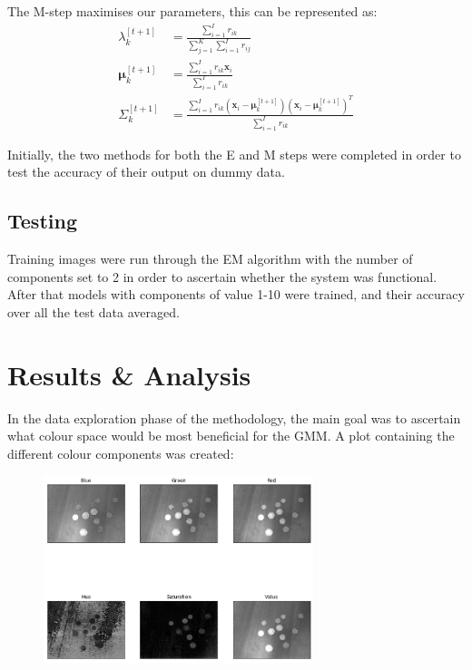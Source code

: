 \documentclass[10pt]{article}
\begin{document}
The M-step maximises our parameters, this can be represented as:
$$
\begin{aligned} \lambda_{k}^{[t+1]} &=\frac{\sum_{i=1}^{I} r_{i k}}{\sum_{j=1}^{K} \sum_{i=1}^{I} r_{i j}} \\ \boldsymbol{\mu}_{k}^{[t+1]} &=\frac{\sum_{i=1}^{I} r_{i k} \mathbf{x}_{i}}{\sum_{i=1}^{I} r_{i k}} \\ \Sigma_{k}^{[t+1]} &=\frac{\sum_{i=1}^{I} r_{i k}\left(\mathbf{x}_{i}-\boldsymbol{\mu}_{k}^{[t+1]}\right)\left(\mathbf{x}_{i}-\boldsymbol{\mu}_{k}^{[t+1]}\right)^{T}}{\sum_{i=1}^{I} r_{i k}} \end{aligned}
$$
\cite{princeCVMLI2012}

Initially, the two methods for both the E and M steps were completed in order to test the accuracy of their output on dummy data.

\subsection{Testing}
 Training images were run through the EM algorithm with the number of components set to 2 in order to ascertain whether the system was functional. After that models with components of value 1-10 were trained, and their accuracy over all the test data averaged. 

\section{Results \& Analysis}
In the data exploration phase of the methodology, the main goal was to ascertain what colour space would be most beneficial for the GMM. A plot containing the different  colour components was created:

\begin{figure}[H]
    \includegraphics[width=0.7\textwidth]{Components}
    \centering
\end{figure}
\end{document}
